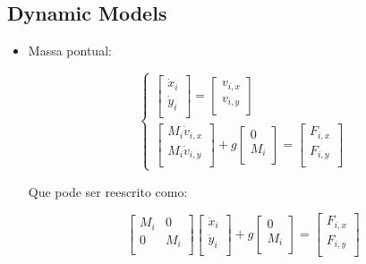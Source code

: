 \subsection{Dynamic Models}\label{S02-2}

\begin{itemize}

\item Massa pontual:



\begin{equation}
\begin{cases}

\begin{bmatrix}
\dot{x}_i \\
\dot{y}_i \\
\end{bmatrix}
=
\begin{bmatrix}
v_{i,x} \\
v_{i,y} \\
\end{bmatrix} \\

\begin{bmatrix}
M_i \dot{v}_{i,x} \\
M_i \dot{v}_{i,y} \\
\end{bmatrix}
+
g \begin{bmatrix}
0 \\
M_i \\
\end{bmatrix}
=
\begin{bmatrix}
F_{i,x} \\
F_{i,y} \\
\end{bmatrix}
\end{cases}
\end{equation}

Que pode ser reescrito como:

$$
\begin{bmatrix}
M_i & 0 \\
0 & M_i \\
\end{bmatrix}
\begin{bmatrix}
\ddot{x}_i \\
\ddot{y}_i \\
\end{bmatrix}
+
g \begin{bmatrix}
0 \\
M_i \\
\end{bmatrix}
=
\begin{bmatrix}
F_{i,x} \\
F_{i,y} \\
\end{bmatrix}
$$


\end{itemize}
